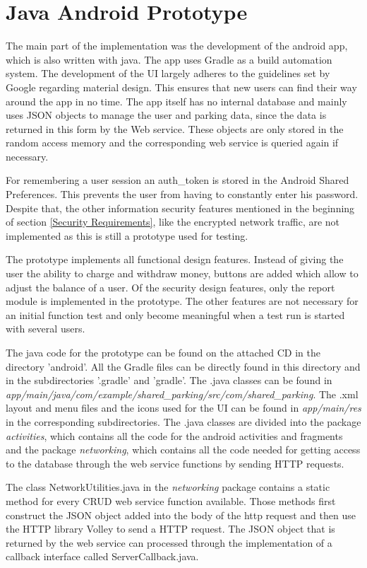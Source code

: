 \section{Java Android Prototype}
The main part of the implementation was the development of the android app, which is also written with java. The app uses Gradle as a build automation system. The development of the UI largely adheres to the guidelines set by Google regarding material design. This ensures that new users can find their way around the app in no time. The app itself has no internal database and mainly uses JSON objects to manage the user and parking data, since the data is returned in this form by the Web service. These objects are only stored in the random access memory and the corresponding web service is queried again if necessary.

For remembering a user session an auth\_token is stored in the Android Shared Preferences. This prevents the user from having to constantly enter his password. Despite that, the other information security features mentioned in the beginning of section \ref{Security Requirements}, like the encrypted network traffic, are not implemented as this is still a prototype used for testing.

The prototype implements all functional design features. Instead of giving the user the ability to charge and withdraw money, buttons are added which allow to adjust the balance of a user. Of the security design features, only the report module is implemented in the prototype. The other features are not necessary for an initial function test and only become meaningful when a test run is started with several users.

The java code for the prototype can be found on the attached CD in the directory 'android'. All the Gradle files can be directly found in this directory and in the subdirectories '.gradle' and 'gradle'. The .java classes can be found in \textit{app\-/main\-/ja\-va\-/com\-/e\-xam\-ple\-/sha\-red\-\_par\-king\-/src\-/com\-/sha\-red\-\_par\-king}. The .xml layout and menu files and the icons used for the UI can be found in \textit{app/main/res} in the corresponding subdirectories. The .java classes are divided into the package \textit{activities}, which contains all the code for the android activities and fragments and the package \textit{networking}, which contains all the code needed for getting access to the database through the web service functions by sending HTTP requests.

The class NetworkUtilities.java in the \textit{networking} package contains a static method for every CRUD web service function available. Those methods first construct the JSON object added into the body of the http request and then use the HTTP library Volley to send a HTTP request. The JSON object that is returned by the web service can processed through the implementation of a callback interface called ServerCallback.java.

